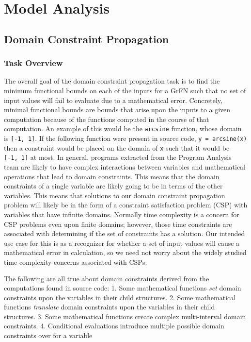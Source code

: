 \documentclass[article, 12pt, oneside]{memoir}
\begin{document}
\hypertarget{model-analysis}{%
\section{Model Analysis}\label{model-analysis}}

\hypertarget{domain-constraint-propagation}{%
\subsection{Domain Constraint
Propagation}\label{domain-constraint-propagation}}

\hypertarget{task-overview}{%
\subsubsection{Task Overview}\label{task-overview}}

The overall goal of the domain constraint propagation task is to find
the minimum functional bounds on each of the inputs for a GrFN such that
no set of input values will fail to evaluate due to a mathematical
error. Concretely, minimal functional bounds are bounds that arise upon
the inputs to a given computation because of the functions computed in
the course of that computation. An example of this would be the
\texttt{arcsine} function, whose domain is \texttt{{[}-1,\ 1{]}}. If the
following function were present in source code,
\texttt{y\ =\ arcsine(x)} then a constraint would be placed on the
domain of \texttt{x} such that it would be \texttt{{[}-1,\ 1{]}} at
most. In general, programs extracted from the Program Analysis team are
likely to have complex interactions between variables and mathematical
operations that lead to domain constraints. This means that the domain
constraints of a single variable are likely going to be in terms of the
other variables. This means that solutions to our domain constraint
propagation problem will likely be in the form of a constraint
satisfaction problem (CSP) with variables that have infinite domains.
Normally time complexity is a concern for CSP problems even upon finite
domains; however, those time constraints are associated with determining
if the set of constraints has a solution. Our intended use case for this
is as a recognizer for whether a set of input values will cause a
mathematical error in calculation, so we need not worry about the widely
studied time complexity concerns associated with CSPs.

The following are all true about domain constraints derived from the
computations found in source code: 1. Some mathematical functions
\emph{set} domain constraints upon the variables in their child
structures. 2. Some mathematical functions \emph{translate} domain
constraints upon the variables in their child structures. 3. Some
mathematical functions create complex multi-interval domain constraints.
4. Conditional evaluations introduce multiple possible domain
constraints over for a variable
\end{document}
